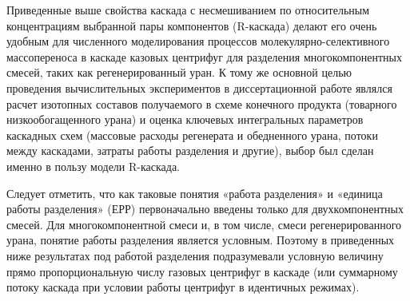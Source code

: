 Приведенные выше свойства каскада с несмешиванием по относительным концентрациям выбранной пары компонентов (R-каскада) делают его очень удобным для численного моделирования процессов молекулярно-селективного массопереноса в каскаде казовых центрифуг для разделения многокомпонентных смесей, таких как регенерированный уран. К тому же основной целью проведения вычислительных экспериментов в диссертационной работе являлся расчет изотопных составов получаемого в схеме конечного продукта (товарного низкообогащенного урана) и оценка ключевых интегральных параметров каскадных схем (массовые расходы регенерата и обедненного урана, потоки между каскадами, затраты работы разделения и другие), выбор был сделан именно в пользу модели R-каскада. 

Следует отметить, что как таковые понятия «работа разделения» и «единица работы разделения» (ЕРР) первоначально введены только для двухкомпонентных смесей. Для многокомпонентной смеси и, в том числе, смеси регенерированного урана, понятие работы разделения является условным. Поэтому в приведенных ниже результатах под работой разделения подразумевали условную величину прямо пропорциональную числу газовых центрифуг в каскаде (или суммарному потоку каскада при условии работы центрифуг в идентичных режимах).